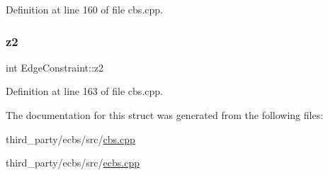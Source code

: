 Definition at line 160 of file cbs.\+cpp.

\mbox{\label{struct_edge_constraint_a11aa005fe0bd29b4bf4da5e0429dcba6}} 
\subsubsection{\texorpdfstring{z2}{z2}}
{\footnotesize\ttfamily int Edge\+Constraint\+::z2}



Definition at line 163 of file cbs.\+cpp.



The documentation for this struct was generated from the following files\+:\begin{DoxyCompactItemize}
\item 
third\+\_\+party/ecbs/src/\hyperlink{cbs_8cpp}{cbs.\+cpp}\item 
third\+\_\+party/ecbs/src/\hyperlink{ecbs_8cpp}{ecbs.\+cpp}\end{DoxyCompactItemize}
